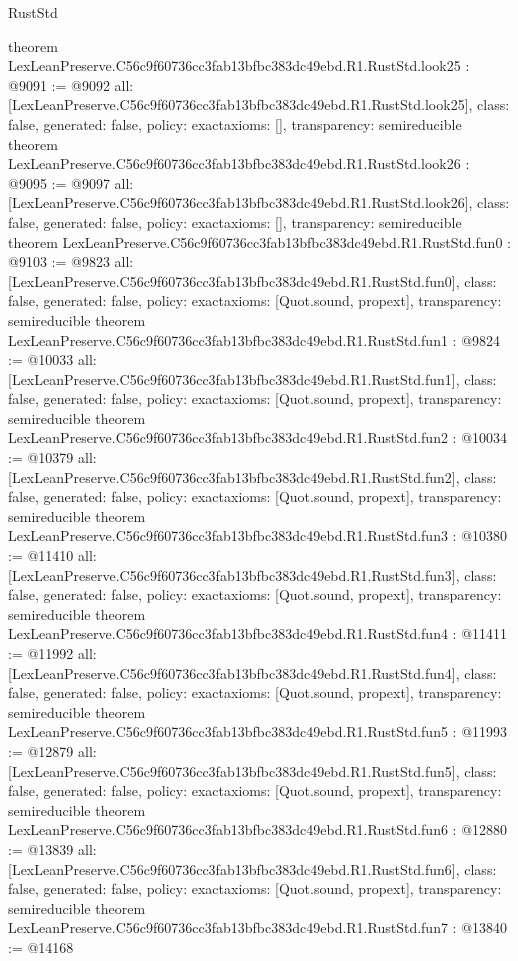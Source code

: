 \begin{lexlean}{RustStd}
\begin{coremodule}
{}
theorem LexLeanPreserve.C56c9f60736cc3fab13bfbc383dc49ebd.R1.RustStd.look25 : @9091 := @9092 {
  all: [LexLeanPreserve.C56c9f60736cc3fab13bfbc383dc49ebd.R1.RustStd.look25],
  class: false,
  generated: false,
  policy: exact{axioms: []},
  transparency: semireducible
}
theorem LexLeanPreserve.C56c9f60736cc3fab13bfbc383dc49ebd.R1.RustStd.look26 : @9095 := @9097 {
  all: [LexLeanPreserve.C56c9f60736cc3fab13bfbc383dc49ebd.R1.RustStd.look26],
  class: false,
  generated: false,
  policy: exact{axioms: []},
  transparency: semireducible
}
theorem LexLeanPreserve.C56c9f60736cc3fab13bfbc383dc49ebd.R1.RustStd.fun0 : @9103 := @9823 {
  all: [LexLeanPreserve.C56c9f60736cc3fab13bfbc383dc49ebd.R1.RustStd.fun0],
  class: false,
  generated: false,
  policy: exact{axioms: [Quot.sound, propext]},
  transparency: semireducible
}
theorem LexLeanPreserve.C56c9f60736cc3fab13bfbc383dc49ebd.R1.RustStd.fun1 : @9824 := @10033 {
  all: [LexLeanPreserve.C56c9f60736cc3fab13bfbc383dc49ebd.R1.RustStd.fun1],
  class: false,
  generated: false,
  policy: exact{axioms: [Quot.sound, propext]},
  transparency: semireducible
}
theorem LexLeanPreserve.C56c9f60736cc3fab13bfbc383dc49ebd.R1.RustStd.fun2 : @10034 := @10379 {
  all: [LexLeanPreserve.C56c9f60736cc3fab13bfbc383dc49ebd.R1.RustStd.fun2],
  class: false,
  generated: false,
  policy: exact{axioms: [Quot.sound, propext]},
  transparency: semireducible
}
theorem LexLeanPreserve.C56c9f60736cc3fab13bfbc383dc49ebd.R1.RustStd.fun3 : @10380 := @11410 {
  all: [LexLeanPreserve.C56c9f60736cc3fab13bfbc383dc49ebd.R1.RustStd.fun3],
  class: false,
  generated: false,
  policy: exact{axioms: [Quot.sound, propext]},
  transparency: semireducible
}
theorem LexLeanPreserve.C56c9f60736cc3fab13bfbc383dc49ebd.R1.RustStd.fun4 : @11411 := @11992 {
  all: [LexLeanPreserve.C56c9f60736cc3fab13bfbc383dc49ebd.R1.RustStd.fun4],
  class: false,
  generated: false,
  policy: exact{axioms: [Quot.sound, propext]},
  transparency: semireducible
}
theorem LexLeanPreserve.C56c9f60736cc3fab13bfbc383dc49ebd.R1.RustStd.fun5 : @11993 := @12879 {
  all: [LexLeanPreserve.C56c9f60736cc3fab13bfbc383dc49ebd.R1.RustStd.fun5],
  class: false,
  generated: false,
  policy: exact{axioms: [Quot.sound, propext]},
  transparency: semireducible
}
theorem LexLeanPreserve.C56c9f60736cc3fab13bfbc383dc49ebd.R1.RustStd.fun6 : @12880 := @13839 {
  all: [LexLeanPreserve.C56c9f60736cc3fab13bfbc383dc49ebd.R1.RustStd.fun6],
  class: false,
  generated: false,
  policy: exact{axioms: [Quot.sound, propext]},
  transparency: semireducible
}
theorem LexLeanPreserve.C56c9f60736cc3fab13bfbc383dc49ebd.R1.RustStd.fun7 : @13840 := @14168 {
}
\end{coremodule}
\end{lexlean}
